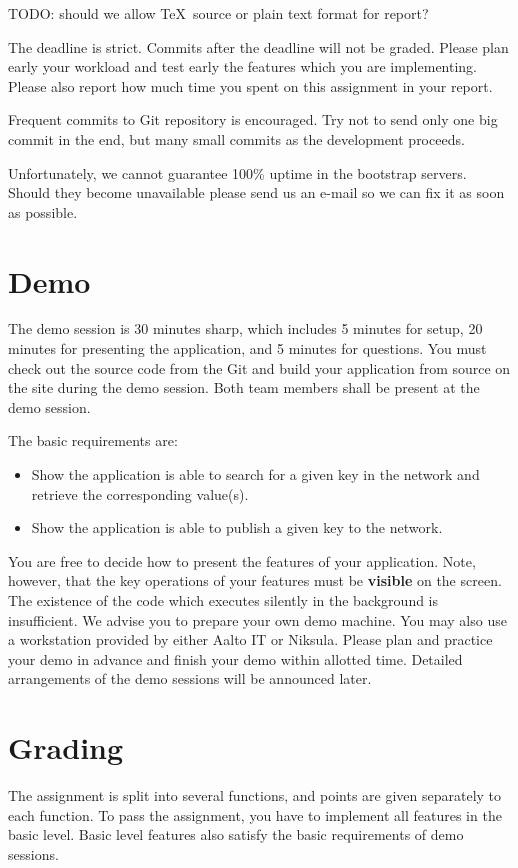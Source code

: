 \documentclass[12pt, a4paper]{article}
\newcommand{\TODO}[1]{\noindent\colorbox{aaltoYellow}{\color{black} TODO: #1}}
\begin{document}
\TODO{should we allow \TeX\ source or plain text format for report?}

The deadline is strict.
Commits after the deadline will not be graded.
Please plan early your workload and test early the features which you are implementing.
Please also report how much time you spent on this assignment in your report.

Frequent commits to Git repository is encouraged.
Try not to send only one big commit in the end, but many small commits as the development proceeds.

Unfortunately, we cannot guarantee 100\% uptime in the bootstrap servers.
Should they become unavailable please send us an e-mail so we can fix it as soon as possible.


\section{Demo}
The demo session is 30 minutes sharp, which includes 5 minutes for setup, 20 minutes for presenting the application, and 5 minutes for questions.
You must check out the source code from the Git and build your application from source on the site during the demo session.
Both team members shall be present at the demo session.

The basic requirements are:
\begin{itemize}
\item Show the application is able to search for a given key in the network and retrieve the corresponding value(s).
\item Show the application is able to publish a given key to the network.
\end{itemize}

You are free to decide how to present the features of your application.
Note, however, that the key operations of your features must be \textbf{visible} on the screen.
The existence of the code which executes silently in the background is insufficient.
We advise you to prepare your own demo machine.
You may also use a workstation provided by either Aalto IT or Niksula.
Please plan and practice your demo in advance and finish your demo within allotted time.
Detailed arrangements of the demo sessions will be announced later.


\section{Grading}
The assignment is split into several functions, and points are given separately to each function.
To pass the assignment, you have to implement all features in the basic level.
Basic level features also satisfy the basic requirements of demo sessions.
\end{document}
